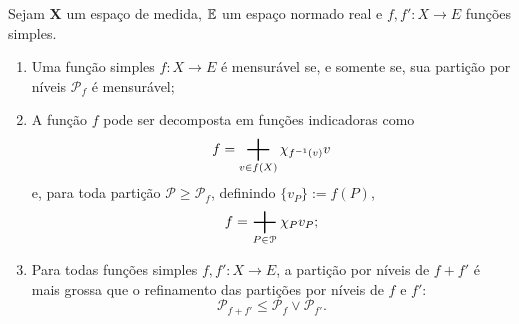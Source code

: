 \begin{prop}
Sejam $\bm X$ um espaço de medida, $\mathbb{E}$ um espaço normado real e $f,f'\colon X \to E$ funções simples.
	\begin{enumerate}
	\item Uma função simples $f\colon X \to E$ é mensurável se, e somente se, sua partição por níveis $\mathcal P_f$ é mensurável;
	
	\item A função $f$ pode ser decomposta em funções indicadoras como
		\begin{equation*}
		f = \sum_{v \in f(X)} \idc_{f\inv(v)} v
		\end{equation*}
e, para toda partição $\mathcal P \geq \mathcal P_f$, definindo $\{v_P\} := f(P)$,
		\begin{equation*}
		f = \sum_{P \in \mathcal P} \idc_P v_P;
		\end{equation*}
	
	\item Para todas funções simples $f,f'\colon X \to E$, a partição por níveis de $f+f'$ é mais grossa que o refinamento das partições por níveis de $f$ e $f'$:
		\begin{equation*}
		\mathcal P_{f+f'} \leq \mathcal P_f \vee \mathcal P_{f'}.
		\end{equation*}
	\end{enumerate}
\end{prop}
